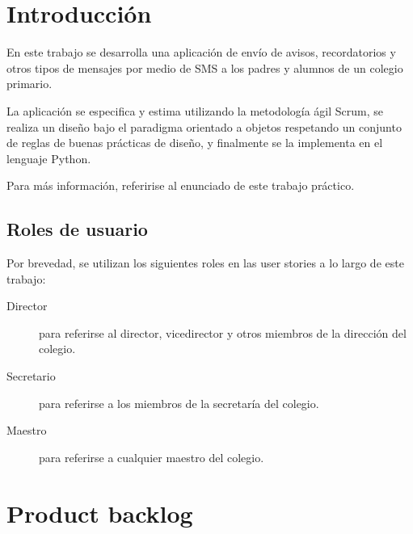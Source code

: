 \documentclass[a4paper, 10pt, twoside]{article}
\begin{document}
\newpage



\section{Introducción}

En este trabajo se desarrolla una aplicación de envío de avisos, recordatorios y otros tipos de mensajes por medio de SMS a los padres y alumnos de un colegio primario.

La aplicación se especifica y estima utilizando la metodología ágil Scrum, se realiza un diseño bajo el paradigma orientado a objetos respetando un conjunto de reglas de buenas prácticas de diseño, y finalmente se la implementa en el lenguaje Python.

Para más información, referirise al enunciado de este trabajo práctico.


\subsection{Roles de usuario}

Por brevedad, se utilizan los siguientes roles en las user stories a lo largo de este trabajo:

\begin{description}
  \item[Director] para referirse al director, vicedirector y otros miembros de la dirección del colegio.

  \item[Secretario] para referirse a los miembros de la secretaría del colegio.

  \item[Maestro] para referirse a cualquier maestro del colegio.
\end{description}



\section{Product backlog}
\end{document}
